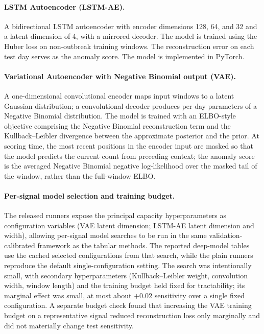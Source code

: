 \documentclass[11pt]{article}
\begin{document}
\paragraph{LSTM Autoencoder (LSTM-AE).} A bidirectional LSTM autoencoder with encoder dimensions 128, 64, and 32 and a latent dimension of 4, with a mirrored decoder. The model is trained using the Huber loss on non-outbreak training windows. The reconstruction error on each test day serves as the anomaly score. The model is implemented in PyTorch.

\paragraph{Variational Autoencoder with Negative Binomial output (VAE).} A one-dimensional convolutional encoder maps input windows to a latent Gaussian distribution; a convolutional decoder produces per-day parameters of a Negative Binomial distribution. The model is trained with an ELBO-style objective comprising the Negative Binomial reconstruction term and the Kullback--Leibler divergence between the approximate posterior and the prior. At scoring time, the most recent positions in the encoder input are masked so that the model predicts the current count from preceding context; the anomaly score is the averaged Negative Binomial negative log-likelihood over the masked tail of the window, rather than the full-window ELBO.

\paragraph{Per-signal model selection and training budget.} The released runners expose the principal capacity hyperparameters as configuration variables (VAE latent dimension; LSTM-AE latent dimension and width), allowing per-signal model searches to be run in the same validation-calibrated framework as the tabular methods. The reported deep-model tables use the cached selected configurations from that search, while the plain runners reproduce the default single-configuration setting. The search was intentionally small, with secondary hyperparameters (Kullback--Leibler weight, convolution width, window length) and the training budget held fixed for tractability; its marginal effect was small, at most about $+0.02$ sensitivity over a single fixed configuration. A separate budget check found that increasing the VAE training budget on a representative signal reduced reconstruction loss only marginally and did not materially change test sensitivity.
\end{document}
